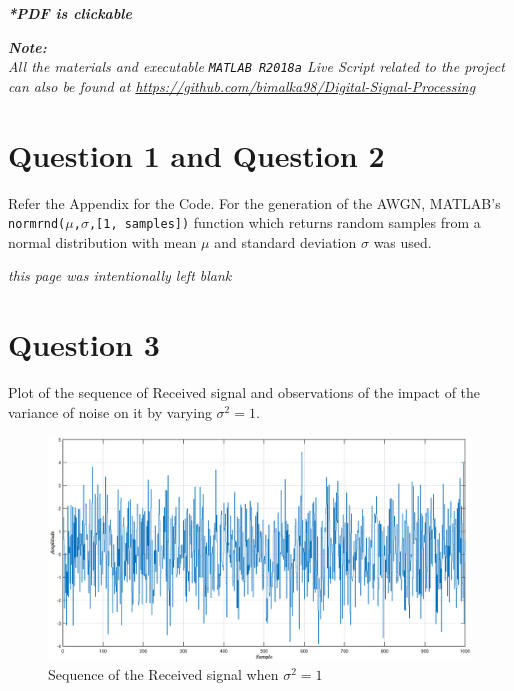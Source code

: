 \documentclass[a4paper,11pt]{article}%
\begin{document}



\pagebreak

\tableofcontents
\listoffigures
\vfill
\begin{center}
	\textbf{\textit{*PDF is clickable}}
\end{center}

\textit{\textbf{Note:}}\\
\textit{All the materials and executable {\tt MATLAB R2018a} Live Script related to the project can also be found at \url{https://github.com/bimalka98/Digital-Signal-Processing}}
\pagebreak

\section{Question 1 and Question 2}
Refer the Appendix for the Code. For the generation of the AWGN, MATLAB's {\tt normrnd($\mu$,$\sigma$,[1, samples])} function which returns random samples from a normal distribution with mean $\mu$ and standard deviation $\sigma$ was used.\\

\vspace{10cm}
\begin{center}
	\textit{this page was intentionally left blank}
\end{center}

\pagebreak

\section{Question 3}
Plot of the sequence of Received signal and observations of the impact of the variance of noise on it by varying $\sigma^2=1$.

\begin{figure}[!h]
	\centering
	\includegraphics[scale=0.45]{figures/q3f1}
	\caption{Sequence of the Received signal when $\sigma^2 = 1$}
\end{figure}
\end{document}
